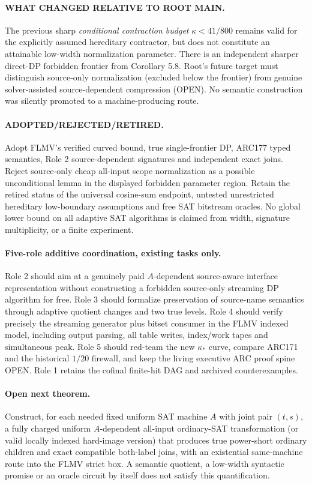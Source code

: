 \documentclass[11pt]{article}
\begin{document}
\paragraph{WHAT CHANGED RELATIVE TO ROOT MAIN.}
The previous sharp \emph{conditional contraction budget}
$\kappa<41/800$ remains valid for the explicitly assumed hereditary
contractor, but does not constitute an attainable low-width normalization
parameter. There is an independent sharper direct-DP forbidden frontier
from Corollary 5.8. Root's future target must distinguish source-only
normalization (excluded below the frontier) from genuine solver-assisted
source-dependent compression (OPEN). No semantic construction was
silently promoted to a machine-producing route.

\paragraph{ADOPTED/REJECTED/RETIRED.}
Adopt FLMV's verified curved bound, true single-frontier DP, ARC177 typed
semantics, Role 2 source-dependent signatures and independent exact joins.
Reject source-only cheap all-input scope normalization as a possible
unconditional lemma in the displayed forbidden parameter region.
Retain the retired status of the universal cosine-sum endpoint,
untested unrestricted hereditary low-boundary assumptions and free SAT
bitstream oracles. No global lower bound on all adaptive SAT algorithms is
claimed from width, signature multiplicity, or a finite experiment.

\paragraph{Five-role additive coordination, existing tasks only.}
Role 2 should aim at a genuinely paid $A$-dependent source-aware interface
representation without constructing a forbidden source-only streaming DP
algorithm for free. Role 3 should formalize preservation of source-name
semantics through adaptive quotient changes and two true levels. Role 4
should verify precisely the streaming generator plus bitset consumer in
the FLMV indexed model, including output parsing, all table writes,
index/work tapes and simultaneous peak. Role 5 should red-team the new
$\kappa_*$ curve, compare ARC171 and the historical $1/20$ firewall,
and keep the living executive ARC proof spine OPEN. Role 1 retains the
cofinal finite-hit DAG and archived counterexamples.

\paragraph{Open next theorem.}
Construct, for each needed fixed uniform SAT machine $A$ with joint pair
$(t,s)$, a fully charged uniform $A$-dependent all-input ordinary-SAT
transformation (or valid locally indexed hard-image version) that produces
true power-short ordinary children and exact compatible both-label joins,
with an existential same-machine route into the FLMV strict box.
A semantic quotient, a low-width syntactic promise or an oracle circuit
by itself does not satisfy this quantification.
\end{document}
